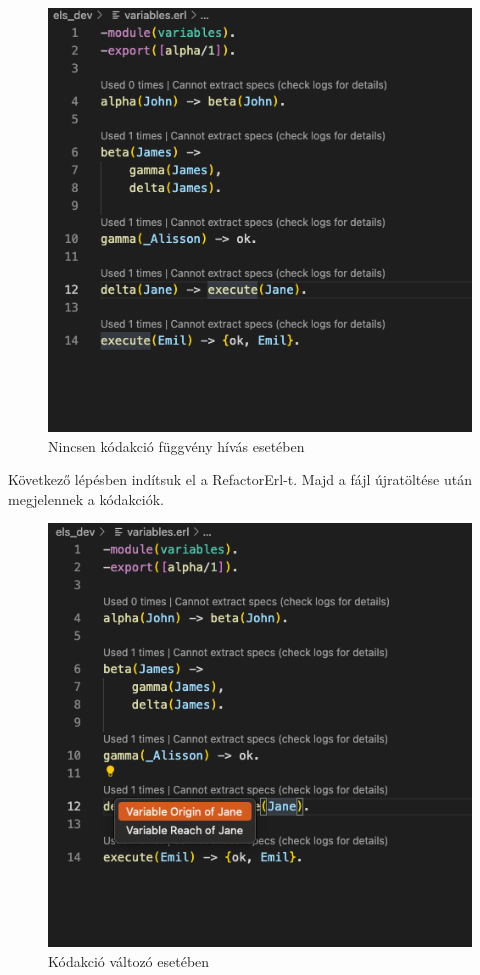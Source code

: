 \begin{figure}[H]
  \centering
  \includegraphics[width=0.7\linewidth]{images/testCases/NoCodeActApp.png}
  \caption{Nincsen kódakció függvény hívás esetében}
  \label{fig:NoCodeActApp}
\end{figure}

Következő lépésben indítsuk el a RefactorErl-t. Majd a fájl újratöltése után megjelennek a kódakciók.

\begin{figure}[H]
  \centering
  \includegraphics[width=0.7\linewidth]{images/testCases/CodeActVar.png}
  \caption{Kódakció változó esetében}
  \label{fig:CodeActVar}
\end{figure}

